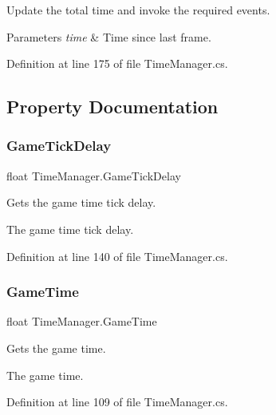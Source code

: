Update the total time and invoke the required events. 


\begin{DoxyParams}{Parameters}
{\em time} & Time since last frame.\\
\hline
\end{DoxyParams}


Definition at line 175 of file Time\+Manager.\+cs.



\subsection{Property Documentation}
\mbox{\label{class_time_manager_ab76892d73eb84bacf19ffea6b603c03c}} 
\subsubsection{\texorpdfstring{Game\+Tick\+Delay}{GameTickDelay}}
{\footnotesize\ttfamily float Time\+Manager.\+Game\+Tick\+Delay\hspace{0.3cm}{\ttfamily [get]}}



Gets the game time tick delay. 

The game time tick delay.

Definition at line 140 of file Time\+Manager.\+cs.

\mbox{\label{class_time_manager_ae66e23b656eaad9ea1fe2ec8ffbb4ded}} 
\subsubsection{\texorpdfstring{Game\+Time}{GameTime}}
{\footnotesize\ttfamily float Time\+Manager.\+Game\+Time\hspace{0.3cm}{\ttfamily [get]}}



Gets the game time. 

The game time.

Definition at line 109 of file Time\+Manager.\+cs.

\mbox{\label{class_time_manager_a8c617ca2654bfe0d219d75a1c18afaad}} 
